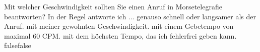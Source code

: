     {Mit welcher Geschwindigkeit sollten Sie einen Anruf in Morsetelegrafie beantworten? In der Regel antworte ich ...}
    {genauso schnell oder langsamer als der Anruf.}
    {mit meiner gewohnten Geschwindigkeit.}
    {mit einem Gebetempo von maximal 60 CPM.}
    {mit dem höchsten Tempo, das ich fehlerfrei geben kann.}
    {false}{false}